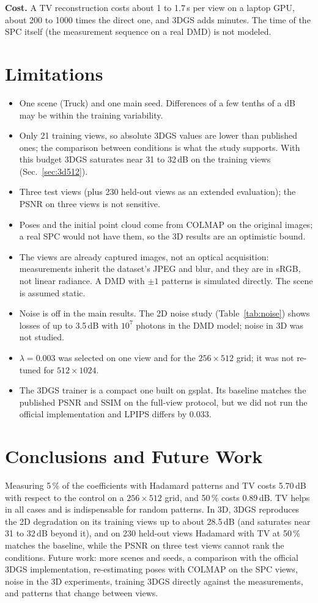 \documentclass[conference]{IEEEtran}
\begin{document}
\textbf{Cost.} A TV reconstruction costs about 1 to 1.7\,s per view on a laptop GPU, about 200 to 1000 times the direct one, and
3DGS adds minutes. The time of the SPC itself (the measurement sequence on a real DMD) is not modeled.

\section{Limitations}
\label{sec:limits}
\begin{itemize}
\item One scene (Truck) and one main seed. Differences of a few tenths of a dB may be within the training variability.
\item Only 21 training views, so absolute 3DGS values are lower than published ones; the comparison between conditions is what
the study supports. With this budget 3DGS saturates near 31 to 32\,dB on the training views (Sec.~\ref{sec:3d512}).
\item Three test views (plus 230 held-out views as an extended evaluation); the PSNR on three views is not sensitive.
\item Poses and the initial point cloud come from COLMAP on the original images; a real SPC would not have them, so the 3D results
are an optimistic bound.
\item The views are already captured images, not an optical acquisition: measurements inherit the dataset's JPEG and blur, and
they are in sRGB, not linear radiance. A DMD with $\pm1$ patterns is simulated directly. The scene is assumed static.
\item Noise is off in the main results. The 2D noise study (Table~\ref{tab:noise}) shows losses of up to 3.5\,dB with $10^7$ photons in the DMD model; noise in 3D was not studied.
\item $\lambda=0.003$ was selected on one view and for the $256\times512$ grid; it was not re-tuned for $512\times1024$.
\item The 3DGS trainer is a compact one built on gsplat. Its baseline matches the published PSNR and SSIM on the full-view protocol, but we did not run the official implementation and LPIPS differs by 0.033.
\end{itemize}

\section{Conclusions and Future Work}
Measuring 5\,\% of the coefficients with Hadamard patterns and TV costs 5.70\,dB with respect to the control on a
$256\times512$ grid, and 50\,\% costs 0.89\,dB. TV helps in all cases and is indispensable for random patterns. In 3D, 3DGS
reproduces the 2D degradation on its training views up to about 28.5\,dB (and saturates near 31 to 32\,dB beyond it), and on 230 held-out views Hadamard with TV at 50\,\% matches the
baseline, while the PSNR on three test views cannot rank the conditions. Future work: more scenes and seeds, a comparison with the
official 3DGS implementation, re-estimating poses with COLMAP on the SPC views, noise in the 3D experiments, training 3DGS
directly against the measurements, and patterns that change between views.
\end{document}
